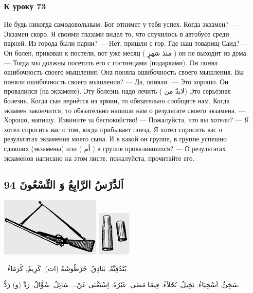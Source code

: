 \documentclass[a5paper]{article}
\begin{document}
\subsubsection{К уроку 73}
Не будь никогда самодовольным, Бог отнимет у тебя успех. Когда экзамен? — Экзамен скоро. Я своими глазами видел то, что случилось в автобусе среди парней. Из города были парни? — Нет, пришли с гор. Где наш товарищ Саид? — Он болен, прикован к постели, вот уже месяц ( منذ شهرٍ ) он не выходит из дома. — Тогда мы должны посетить его с гостинцами (подарками). Он понял ошибочность своего мышления. Она поняла ошибочность своего мышления. Вы поняли ошибочность своего мышления? — Да, поняли. — Это хорошо. Он провалился (на экзамене). Эту болезнь надо лечить ( لابدّ من) Это серьёзная болезнь. Когда сын вернётся из армии, то обязательно сообщите нам. Когда экзамен закончится, то обязательно напиши нам о результате своего экзамена. — Хорошо, напишу. Извините за беспокойство! — Пожалуйста, что вы хотели? — Я хотел спросить вас о том, когда прибывает поезд. Я хотел спросить вас о результатах экзаменов моего сына. И в какой он группе, в группе успешно сдавших (экзамены) или ( أم ) в группе провалившихся? — О результатах экзаменов написано на этом листе, пожалуйста, прочитайте его.

\subsection{اَلدَّرْسُ الرَّابِعُ وَ التِّسْعُونَ 94}
 \includegraphics[width=1.9791in,height=1.1665in]{MuhammadBagauddinlatinized-img266.png}   \includegraphics[width=0.6563in,height=0.8854in]{MuhammadBagauddinlatinized-img267.png} 

\ بُنْدُقِيَّةٌ, بَنَادِقُ. خَرْطُوشَةٌ (ات). كَرِيمٌ, كُرَمَاءُ. 

سَخِىٌّ, اَسْخِيَاءُ. بَخِيلٌ, بُخَلاَءُ. فِيمَا مَضَى. غَيْرُهُ. اِسْتَغْنَى عَنْ... سَائِلٌ, سُؤَّالٌ. رَدَّ (و) رَدٌّ. 
\end{document}
